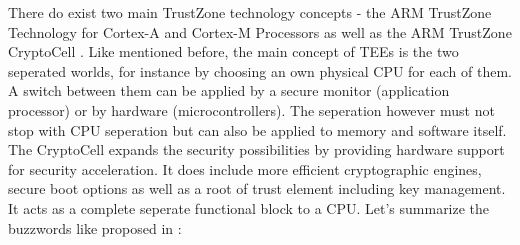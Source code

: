 There do exist two main TrustZone technology concepts - the ARM TrustZone Technology for Cortex-A and Cortex-M Processors as well as the ARM TrustZone CryptoCell \parencite{trustzone}. Like mentioned before, the main concept of TEEs is the two seperated worlds, for instance by choosing an own physical CPU for each of them. A switch between them can be applied by a secure monitor (application processor) or by hardware (microcontrollers). The seperation however must not stop with CPU seperation but can also be applied to memory and
software itself. The CryptoCell expands the security possibilities by providing
hardware support for security acceleration. It does include more efficient
cryptographic engines, secure boot options as well as a root of trust element including key management. It acts as a complete seperate functional block to a CPU. Let's summarize the buzzwords like proposed in \parencite{tee_guide}:

